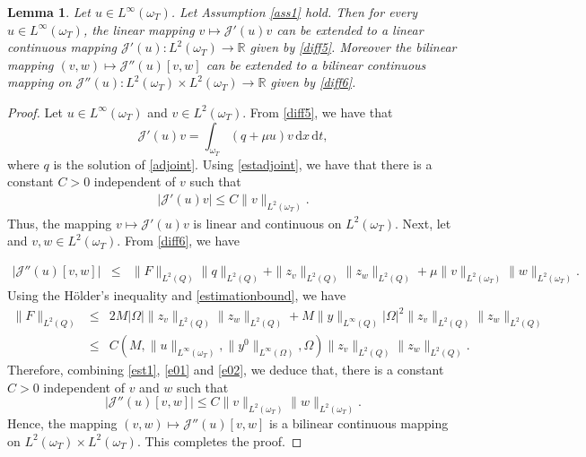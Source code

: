 \documentclass[reqno,twoside]{amsart}
\numberwithin{equation}{section}
\newtheorem{lemma}[theorem]{Lemma}
\theoremstyle{definition}
\numberwithin{equation}{section}
\def \dis {\displaystyle}
\def \R {\mathbb{R}}
\def \dq {\mathrm{d}x \, \mathrm{d}t}
\def \R {\mathbb{R}}
\begin{document}
\begin{lemma}\label{cont1} Let $u\in L^\infty(\omega_T)$. Let Assumption \ref{ass1} hold. Then for every $u\in L^\infty(\omega_T)$,  the linear mapping $v\mapsto \mathcal{J}'(u)v$ can be extended to a linear continuous mapping $\mathcal{J}'(u):L^2(\omega_T)\to \R$ given by \eqref{diff5}. Moreover the bilinear  mapping $(v,w)\mapsto \mathcal{J}''(u)[v,w]$ can be extended to a bilinear continuous mapping on $\mathcal{J}''(u):L^2(\omega_T)\times L^2(\omega_T)\to \R$ given by \eqref{diff6}.
	\end{lemma}	
	\begin{proof} Let $u\in L^\infty(\omega_T)$ and $v\in L^2(\omega_T)$. From \eqref{diff5}, we have that
$$
\mathcal{J}'(u)v=\int_{\omega_T}\left( q+\mu u\right)v\,\dq,
$$
where  $q$ is the solution of \eqref{adjoint}.
Using \eqref{estadjoint},  we have that there is a constant $C>0$ independent of $v$ such that
$$
\begin{array}{lll}
	\dis |\mathcal{J}'(u)v|\leq C\|v\|_{L^2(\omega_T)}.
\end{array}
$$
Thus, the mapping $v\mapsto \mathcal{J}'(u)v$ is linear and continuous on $L^2(\omega_T)$. Next,
let and $v,w\in L^2(\omega_T)$. From \eqref{diff6}, we have

\begin{equation}\label{e01}
	\begin{array}{lll}
		\dis |\mathcal{J}''(u)[v,w]|&\leq& \|F\|_{L^2(Q)}\|q\|_{L^2(Q)}+\|z_v\|_{L^2(Q)}\|z_w\|_{L^2(Q)}+\mu \|v\|_{L^2(\omega_T)}\|w\|_{L^2(\omega_T)}.
	\end{array}
\end{equation}
Using the H\"{o}lder's inequality and \eqref{estimationbound}, we have 	
\begin{equation}\label{e02}
	\begin{array}{lll}
		\dis  \|F\|_{L^2(Q)}&\leq& 2M|\Omega|\|z_v\|_{L^2(Q)}\|z_w\|_{L^2(Q)}+M\|y\|_{L^\infty(Q)}|\Omega|^2\|z_v\|_{L^2(Q)}\|z_w\|_{L^2(Q)}\\
		&\leq& C(M,\|u\|_{L^\infty(\omega_T)},\|y^0\|_{L^\infty(\Omega)},\Omega)\|z_v\|_{L^2(Q)}\|z_w\|_{L^2(Q)}.
	\end{array}
\end{equation}	
Therefore, combining \eqref{est1}, \eqref{e01} and \eqref{e02}, we deduce that, there is a constant $C>0$ independent of $v$ and $w$ such that
$$\dis |\mathcal{J}''(u)[v,w]|\leq C \|v\|_{L^2(\omega_T)}\|w\|_{L^2(\omega_T)}.$$
Hence, the 	mapping $(v,w)\mapsto\mathcal{J}''(u)[v,w]$ is a bilinear continuous mapping on $L^2(\omega_T)\times L^2(\omega_T)$. This completes the proof.
\end{proof}
\end{document}
